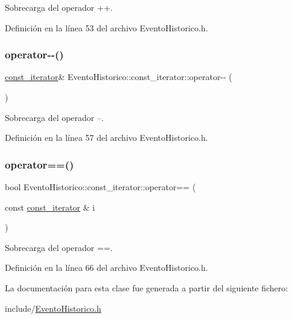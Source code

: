 Sobrecarga del operador ++. 



Definición en la línea 53 del archivo Evento\+Historico.\+h.

\hypertarget{classEventoHistorico_1_1const__iterator_a548f98c2a2fece094500096b991970a0}{}\label{classEventoHistorico_1_1const__iterator_a548f98c2a2fece094500096b991970a0} 
\subsubsection{\texorpdfstring{operator-\/-\/()}{operator--()}}
{\footnotesize\ttfamily \hyperlink{classEventoHistorico_1_1const__iterator}{const\+\_\+iterator}\& Evento\+Historico\+::const\+\_\+iterator\+::operator-\/-\/ (\begin{DoxyParamCaption}{ }\end{DoxyParamCaption})\hspace{0.3cm}{\ttfamily [inline]}}



Sobrecarga del operador --. 



Definición en la línea 57 del archivo Evento\+Historico.\+h.

\hypertarget{classEventoHistorico_1_1const__iterator_a6f68d0b043b55b7ff3ae73e4da86861a}{}\label{classEventoHistorico_1_1const__iterator_a6f68d0b043b55b7ff3ae73e4da86861a} 
\subsubsection{\texorpdfstring{operator==()}{operator==()}}
{\footnotesize\ttfamily bool Evento\+Historico\+::const\+\_\+iterator\+::operator== (\begin{DoxyParamCaption}\item[{const \hyperlink{classEventoHistorico_1_1const__iterator}{const\+\_\+iterator} \&}]{i }\end{DoxyParamCaption})\hspace{0.3cm}{\ttfamily [inline]}}



Sobrecarga del operador ==. 



Definición en la línea 66 del archivo Evento\+Historico.\+h.



La documentación para esta clase fue generada a partir del siguiente fichero\+:\begin{DoxyCompactItemize}
\item 
include/\hyperlink{EventoHistorico_8h}{Evento\+Historico.\+h}\end{DoxyCompactItemize}
